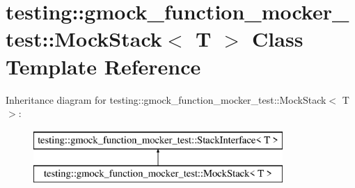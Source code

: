\hypertarget{classtesting_1_1gmock__function__mocker__test_1_1MockStack}{}\section{testing\+:\+:gmock\+\_\+function\+\_\+mocker\+\_\+test\+:\+:Mock\+Stack$<$ T $>$ Class Template Reference}
\label{classtesting_1_1gmock__function__mocker__test_1_1MockStack}
Inheritance diagram for testing\+:\+:gmock\+\_\+function\+\_\+mocker\+\_\+test\+:\+:Mock\+Stack$<$ T $>$\+:\begin{figure}[H]
\begin{center}
\leavevmode
\includegraphics[height=2.000000cm]{classtesting_1_1gmock__function__mocker__test_1_1MockStack}
\end{center}
\end{figure}

